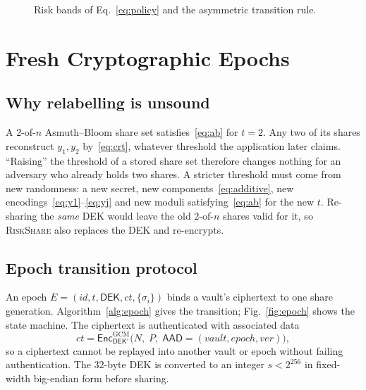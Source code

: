 \documentclass[conference]{IEEEtran}
\newcommand{\RS}{\textsc{RiskShare}}
\newcommand{\DEK}{\mathsf{DEK}}
\newcommand{\Enc}{\mathsf{Enc}}
\begin{document}
\begin{figure}[t]
\centering
{}
\caption{Risk bands of Eq.~\eqref{eq:policy} and the asymmetric transition rule.}
\label{fig:bands}
\end{figure}

\section{Fresh Cryptographic Epochs}
\label{sec:epochs}

\subsection{Why relabelling is unsound}
A 2-of-$n$ Asmuth--Bloom share set satisfies~\eqref{eq:ab} for $t=2$. Any two of its shares reconstruct $y_1,y_2$ by~\eqref{eq:crt}, whatever threshold the application later claims. ``Raising'' the threshold of a stored share set therefore changes nothing for an adversary who already holds two shares. A stricter threshold must come from new randomness: a new secret, new components~\eqref{eq:additive}, new encodings~\eqref{eq:y1}--\eqref{eq:yj} and new moduli satisfying~\eqref{eq:ab} for the new $t$. Re-sharing the \emph{same} DEK would leave the old 2-of-$n$ shares valid for it, so \RS{} also replaces the DEK and re-encrypts.

\subsection{Epoch transition protocol}
An epoch $E=(\mathit{id}, t, \DEK, \mathit{ct}, \{\sigma_i\})$ binds a vault's ciphertext to one share generation. Algorithm~\ref{alg:epoch} gives the transition; Fig.~\ref{fig:epoch} shows the state machine. The ciphertext is authenticated with associated data
\begin{equation}
  \mathit{ct} = \Enc^{\mathrm{GCM}}_{\DEK'}\bigl(N,\; P,\; \mathsf{AAD}=(\mathit{vault},\mathit{epoch},\mathit{ver})\bigr),
  \label{eq:gcm}
\end{equation}
so a ciphertext cannot be replayed into another vault or epoch without failing authentication. The 32-byte DEK is converted to an integer $s<2^{256}$ in fixed-width big-endian form before sharing.
\end{document}

